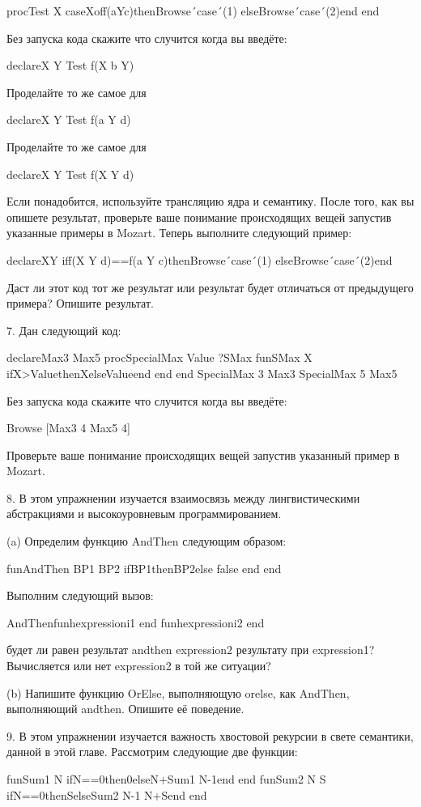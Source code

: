 proc{Test X}
caseXoff(aYc)then{Browse´case´(1)}
else{Browse´case´(2)}end
end

Без запуска кода скажите что случится когда вы введёте:

declareX Y {Test f(X b Y)}

Проделайте то же самое для

declareX Y {Test f(a Y d)}

Проделайте то же самое для

declareX Y {Test f(X Y d)}

Если понадобится, используйте трансляцию ядра и семантику. После того, как вы опишете результат, проверьте ваше понимание происходящих вещей запустив указанные примеры в Mozart. Теперь выполните следующий пример:

declareXY
iff(X Y d)==f(a Y c)then{Browse´case´(1)}
else{Browse´case´(2)}end

Даст ли этот код тот же результат или результат будет отличаться от предыдущего примера? Опишите результат.

7. Дан следующий код:

declareMax3 Max5
proc{SpecialMax Value ?SMax}
fun{SMax X}
ifX>ValuethenXelseValueend
end
end
{SpecialMax 3 Max3}
{SpecialMax 5 Max5}

Без запуска кода скажите что случится когда вы введёте:

{Browse [{Max3 4} {Max5 4}]}

Проверьте ваше понимание происходящих вещей запустив указанный пример в Mozart.

8. В этом упражнении изучается взаимосвязь между лингвистическими абстракциями и высокоуровневым программированием.

(a) Определим функцию AndThen следующим образом:

fun{AndThen BP1 BP2}
if{BP1}then{BP2}else false end
end

Выполним следующий вызов:

{AndThenfun{}hexpressioni1 end
fun{}hexpressioni2 end}

будет ли равен результат andthen expression2 результату при expression1? Вычисляется или нет expression2 в той же ситуации?

(b) Напишите функцию OrElse, выполняющую orelse, как AndThen, выполняющий andthen. Опишите её поведение.

9. В этом упражнении изучается важность хвостовой рекурсии в свете семантики, данной в этой главе. Рассмотрим следующие две функции:

fun{Sum1 N}
ifN==0then0elseN+{Sum1 N-1}end
end
fun{Sum2 N S}
ifN==0thenSelse{Sum2 N-1 N+S}end
end

